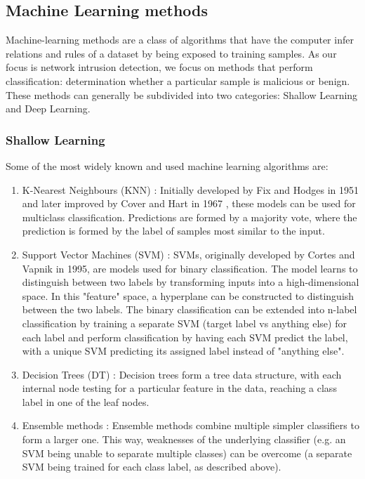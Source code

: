 \newpage
\subsection{Machine Learning methods}
Machine-learning methods are a class of algorithms that have the computer infer relations and rules of a dataset by being exposed to training samples. As our focus is network intrusion detection, we focus on methods that perform classification: determination whether a particular sample is malicious or benign. These methods can generally be subdivided into two categories: Shallow Learning and Deep Learning. 

\subsubsection{Shallow Learning}
Some of the most widely known and used machine learning algorithms are:
\begin{enumerate}
    \item K-Nearest Neighbours (KNN) \cite{knn}: Initially developed by Fix and Hodges in 1951 \cite{fix_hodges} and later improved by Cover and Hart in 1967 \cite{knn}, these models can be used for multiclass classification. Predictions are formed by a majority vote, where the prediction is formed by the label of samples most similar to the input.
    \item Support Vector Machines (SVM) \cite{svm}: SVMs, originally developed by Cortes and Vapnik in 1995, are models used for binary classification. The model learns to distinguish between two labels by transforming inputs into a high-dimensional space. In this "feature" space, a hyperplane can be constructed to distinguish between the two labels. The binary classification can be extended into n-label classification by training a separate SVM (target label vs anything else) for each label and perform classification by having each SVM predict the label, with a unique SVM predicting its assigned label instead of "anything else".
    \item Decision Trees (DT) \cite{decision_trees}: Decision trees form a tree data structure, with each internal node testing for a particular feature in the data, reaching a class label in one of the leaf nodes.
    \item Ensemble methods \cite{ensemble}: Ensemble methods combine multiple simpler classifiers to form a larger one. This way, weaknesses of the underlying classifier (e.g. an SVM being unable to separate multiple classes) can be overcome (a separate SVM being trained for each class label, as described above).
\end{enumerate}

